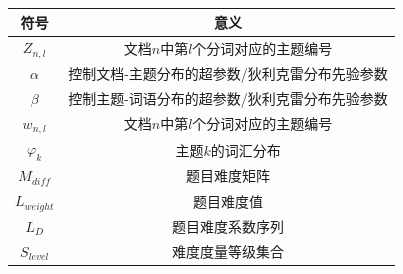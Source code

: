 \begin{table}[h]
    \centering
    \begin{tabular}{@{}cc@{}}
        \toprule
        \quad \quad \quad 符号 \quad \quad \quad           & 意义                       \\ \midrule
        $Z_{n,l}$     & 文档$n$中第$l$个分词对应的主题编号     \\
        $\alpha$      & 控制文档-主题分布的超参数/狄利克雷分布先验参数 \\
        $\beta$       & 控制主题-词语分布的超参数/狄利克雷分布先验参数 \\
        $w_{n,l}$     & 文档$n$中第$l$个分词对应的主题编号     \\
        $\varphi_{k}$ & 主题$k$的词汇分布               \\
        $M_{diff}$    & 题目难度矩阵                   \\
        $L_{weight}$  & 题目难度值                    \\
        $L_D$         & 题目难度系数序列                 \\
        $S_{level}$   & 难度度量等级集合                 \\ \bottomrule
    \end{tabular}
\end{table}